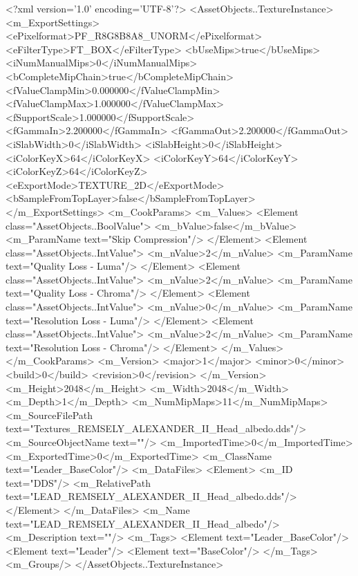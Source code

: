 <?xml version='1.0' encoding='UTF-8'?>
<AssetObjects..TextureInstance>
  <m_ExportSettings>
    <ePixelformat>PF_R8G8B8A8_UNORM</ePixelformat>
    <eFilterType>FT_BOX</eFilterType>
    <bUseMips>true</bUseMips>
    <iNumManualMips>0</iNumManualMips>
    <bCompleteMipChain>true</bCompleteMipChain>
    <fValueClampMin>0.000000</fValueClampMin>
    <fValueClampMax>1.000000</fValueClampMax>
    <fSupportScale>1.000000</fSupportScale>
    <fGammaIn>2.200000</fGammaIn>
    <fGammaOut>2.200000</fGammaOut>
    <iSlabWidth>0</iSlabWidth>
    <iSlabHeight>0</iSlabHeight>
    <iColorKeyX>64</iColorKeyX>
    <iColorKeyY>64</iColorKeyY>
    <iColorKeyZ>64</iColorKeyZ>
    <eExportMode>TEXTURE_2D</eExportMode>
    <bSampleFromTopLayer>false</bSampleFromTopLayer>
  </m_ExportSettings>
  <m_CookParams>
    <m_Values>
      <Element class="AssetObjects..BoolValue">
        <m_bValue>false</m_bValue>
        <m_ParamName text="Skip Compression"/>
      </Element>
      <Element class="AssetObjects..IntValue">
        <m_nValue>2</m_nValue>
        <m_ParamName text="Quality Loss - Luma"/>
      </Element>
      <Element class="AssetObjects..IntValue">
        <m_nValue>2</m_nValue>
        <m_ParamName text="Quality Loss - Chroma"/>
      </Element>
      <Element class="AssetObjects..IntValue">
        <m_nValue>0</m_nValue>
        <m_ParamName text="Resolution Loss - Luma"/>
      </Element>
      <Element class="AssetObjects..IntValue">
        <m_nValue>2</m_nValue>
        <m_ParamName text="Resolution Loss - Chroma"/>
      </Element>
    </m_Values>
  </m_CookParams>
  <m_Version>
    <major>1</major>
    <minor>0</minor>
    <build>0</build>
    <revision>0</revision>
  </m_Version>
  <m_Height>2048</m_Height>
  <m_Width>2048</m_Width>
  <m_Depth>1</m_Depth>
  <m_NumMipMaps>11</m_NumMipMaps>
  <m_SourceFilePath text="Textures\LEAD_REMSELY_ALEXANDER_II_Head_albedo.dds"/>
  <m_SourceObjectName text=""/>
  <m_ImportedTime>0</m_ImportedTime>
  <m_ExportedTime>0</m_ExportedTime>
  <m_ClassName text="Leader_BaseColor"/>
  <m_DataFiles>
    <Element>
      <m_ID text="DDS"/>
      <m_RelativePath text="LEAD_REMSELY_ALEXANDER_II_Head_albedo.dds"/>
    </Element>
  </m_DataFiles>
  <m_Name text="LEAD_REMSELY_ALEXANDER_II_Head_albedo"/>
  <m_Description text=""/>
  <m_Tags>
    <Element text="Leader_BaseColor"/>
    <Element text="Leader"/>
    <Element text="BaseColor"/>
  </m_Tags>
  <m_Groups/>
</AssetObjects..TextureInstance>
